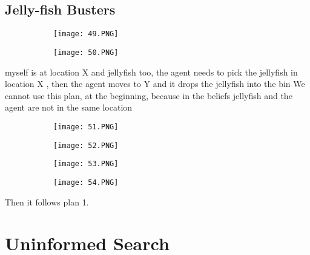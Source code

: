 \documentclass{article}
\begin{document}
\vspace{40mm}

\subsection{Jelly-fish Busters}

\begin{figure}[ht!]
  \centering
  \begin{subfigure}[b]{0.49\linewidth}
    \texttt{[image: 49.PNG]}
  \end{subfigure}
     \begin{subfigure}[b]{0.49\textwidth}
         \centering
         \texttt{[image: 50.PNG]}
     \end{subfigure}
\end{figure}

myself is at location X and jellyfish too, the agent needs to pick the jellyfish in location X , then the agent moves to Y and it drops the jellyfish into the bin
We cannot use this plan, at the beginning,  because in the beliefs jellyfish and the agent are not in the same location


\begin{figure}[ht!]
  \centering
  \begin{subfigure}[b]{0.49\linewidth}
    \texttt{[image: 51.PNG]}
  \end{subfigure}
     \begin{subfigure}[b]{0.49\textwidth}
         \centering
         \texttt{[image: 52.PNG]}
     \end{subfigure}
\end{figure}



\begin{figure}[ht!]
  \centering
  \begin{subfigure}[b]{0.49\linewidth}
    \texttt{[image: 53.PNG]}
  \end{subfigure}
     \begin{subfigure}[b]{0.49\textwidth}
         \centering
         \texttt{[image: 54.PNG]}
     \end{subfigure}
\end{figure}

Then it follows plan 1.



\section{Uninformed Search}
\end{document}
